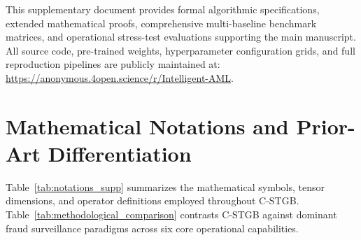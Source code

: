 \documentclass[a4paper,fleqn,twocolumn]{article}
\begin{document}
\pagestyle{myheadings}


\noindent This supplementary document provides formal algorithmic specifications, extended mathematical proofs, comprehensive multi-baseline benchmark matrices, and operational stress-test evaluations supporting the main manuscript. All source code, pre-trained weights, hyperparameter configuration grids, and full reproduction pipelines are publicly maintained at: \url{https://anonymous.4open.science/r/Intelligent-AML}.

\section{Mathematical Notations and Prior-Art Differentiation}
\label{sec:notations_supp}

Table~\ref{tab:notations_supp} summarizes the mathematical symbols, tensor dimensions, and operator definitions employed throughout C-STGB. Table~\ref{tab:methodological_comparison} contrasts C-STGB against dominant fraud surveillance paradigms across six core operational capabilities.
\end{document}
